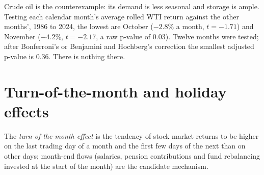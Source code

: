 Crude oil is the counterexample: its demand is less seasonal and storage is ample. Testing each calendar month's average rolled WTI return against the
other months', 1986 to 2024, the lowest are October ($-2.8\%$ a month, $t = -1.71$) and November ($-4.2\%$, $t = -2.17$, a raw p-value of 0.03). Twelve
months were tested; after Bonferroni's or Benjamini and Hochberg's correction the smallest adjusted p-value is 0.36. There is nothing there.

\begin{omfigure}

\label{fig:s1:seasonality-and-calendar-effects:months}
\end{omfigure}

\section{Turn-of-the-month and holiday effects}

\begin{definition}\label{def:s1:seasonality-and-calendar-effects:tom}
The \emph{turn-of-the-month effect} is the tendency of stock market returns to be higher on the last trading day of a
month and the first few days of the next than on other days; month-end flows (salaries, pension contributions and fund rebalancing invested at the
start of the month) are the candidate mechanism.
\end{definition}


